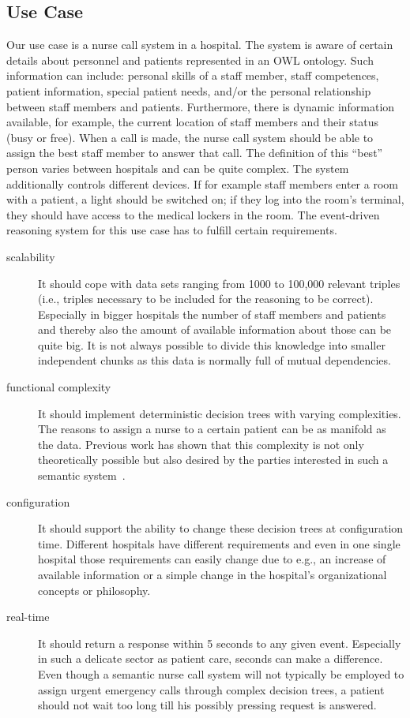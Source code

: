  

\subsection{Use Case}\label{usecase}
Our use case is a nurse call system in a hospital.
The system is aware of certain details about personnel and patients represented in an OWL ontology.
Such information can include: personal skills of a staff member, staff competences, patient information, special patient needs, and/or the 
personal relationship between staff members and patients. 
Furthermore, there is dynamic information available, for example, the current location of staff members and their status (busy or free). 
When a call is made, the nurse
call system should be able to assign the best staff member to answer that call. The definition of this ``best'' person
varies between hospitals and can be quite complex. 
The system additionally controls different devices. If for example staff members enter a room with a patient, 
a light should be switched on; if they log into the room's terminal, they should have access to the medical lockers in the room. 
The event-driven reasoning system for this use case has to fulfill certain requirements.
\begin{description}
\item[scalability] It should cope with data sets ranging from 1000 to 100,000 relevant triples (i.e., triples necessary to be included for the reasoning to be correct). 
Especially in bigger hospitals the number of staff members and patients and thereby also the amount of available information about those can be quite big. 
It is not always possible to divide this knowledge into smaller independent chunks as this data is normally full of mutual dependencies. 
\item[functional complexity] It should implement deterministic decision trees with varying complexities. The reasons to assign a nurse to 
a certain patient can be as manifold as the data. Previous work has shown that this complexity is not only theoretically possible but also desired by the 
parties interested in such a semantic system~\cite{accioont}.
\item[configuration] It should support the ability to change these decision trees at configuration time. Different hospitals have different 
requirements and even in one single hospital those requirements 
can easily change due to e.g., an increase of available information or a simple change in the hospital's organizational concepts or philosophy.
\item[real-time] It should return a response within 5 seconds to any given event. Especially in such a delicate sector as patient care, seconds can make a difference. 
Even though a semantic nurse call system will not typically be employed to assign urgent emergency calls  through complex decision trees, 
a patient should not wait too long till his possibly pressing request is answered.
\end{description}
